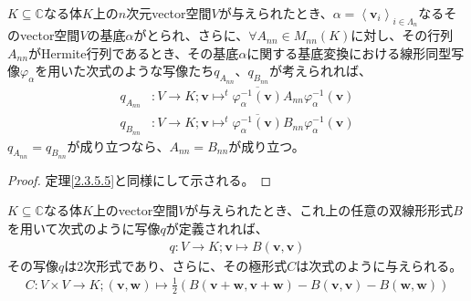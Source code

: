 \documentclass[dvipdfmx]{jsarticle}
\begin{document}
\begin{thm}\label{2.3.5.6}
$K \subseteq \mathbb{C}$なる体$K$上の$n$次元vector空間$V$が与えられたとき、$\alpha = \left\langle \mathbf{v}_{i} \right\rangle_{i \in \varLambda_{n}}$なるそのvector空間$V$の基底$\alpha$がとられ、さらに、$\forall A_{nn} \in M_{nn}(K)$に対し、その行列$A_{nn}$がHermite行列であるとき、その基底$\alpha$に関する基底変換における線形同型写像$\varphi_{\alpha}$を用いた次式のような写像たち$q_{A_{nn}}$、$q_{B_{nn}}$が考えられれば、
\begin{align*}
q_{A_{nn}}&:V \rightarrow K;\mathbf{v} \mapsto^{t}\overline{\varphi_{\alpha}^{- 1}\left( \mathbf{v} \right)}A_{nn}\varphi_{\alpha}^{- 1}\left( \mathbf{v} \right)\\
q_{B_{nn}}&:V \rightarrow K;\mathbf{v} \mapsto^{t}\overline{\varphi_{\alpha}^{- 1}\left( \mathbf{v} \right)}B_{nn}\varphi_{\alpha}^{- 1}\left( \mathbf{v} \right)
\end{align*}
$q_{A_{nn}} = q_{B_{nn}}$が成り立つなら、$A_{nn} = B_{nn}$が成り立つ。
\end{thm}
\begin{proof} 定理\ref{2.3.5.5}と同様にして示される。
\end{proof}
\begin{thm}\label{2.3.5.7}
$K \subseteq \mathbb{C}$なる体$K$上のvector空間$V$が与えられたとき、これ上の任意の双線形形式$B$を用いて次式のように写像$q$が定義されれば、
\begin{align*}
q:V \rightarrow K;\mathbf{v} \mapsto B\left( \mathbf{v},\mathbf{v} \right)
\end{align*}
その写像$q$は2次形式であり、さらに、その極形式$C$は次式のように与えられる。
\begin{align*}
C:V \times V \rightarrow K;\left( \mathbf{v},\mathbf{w} \right) \mapsto \frac{1}{2}\left( B\left( \mathbf{v} + \mathbf{w},\mathbf{v} + \mathbf{w} \right) - B\left( \mathbf{v},\mathbf{v} \right) - B\left( \mathbf{w},\mathbf{w} \right) \right)
\end{align*}
\end{thm}
\end{document}
